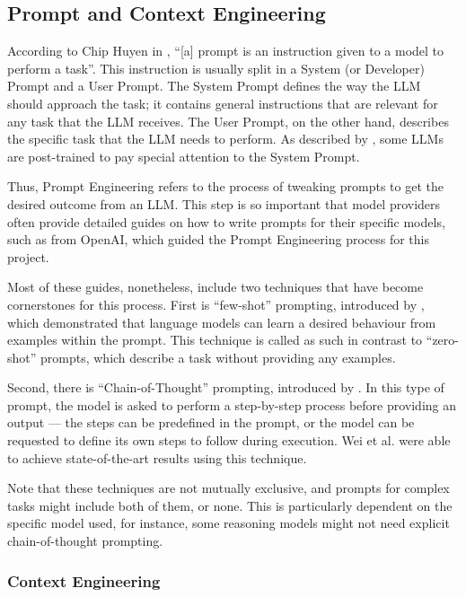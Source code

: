 \documentclass[a4paper]{report}
\begin{document}
\subsection{Prompt and Context Engineering}
\label{sec:prompt-enginering}

According to Chip Huyen in \cite{aiebook2025}, ``[a] prompt is an instruction given to a model to perform a task''. This instruction is usually split in a System (or Developer) Prompt and a User Prompt. The System Prompt defines the way the LLM should approach the task; it contains general instructions that are relevant for any task that the LLM receives. The User Prompt, on the other hand, describes the specific task that the LLM needs to perform. As described by \cite{wallace2024instructionhierarchytrainingllms}, some LLMs are post-trained to pay special attention to the System Prompt.

Thus, Prompt Engineering refers to the process of tweaking prompts to get the desired outcome from an LLM. This step is so important that model providers often provide detailed guides on how to write prompts for their specific models, such as \cite{openai2025promptengineering} from OpenAI, which guided the Prompt Engineering process for this project.

Most of these guides, nonetheless, include two techniques that have become cornerstones for this process. First is ``few-shot'' prompting, introduced by \cite{brown2020languagemodelsfewshotlearners}, which demonstrated that language models can learn a desired behaviour from examples within the prompt. This technique is called as such in contrast to ``zero-shot'' prompts, which describe a task without providing any examples.

Second, there is ``Chain-of-Thought'' prompting, introduced by \cite{wei2023chainofthoughtpromptingelicitsreasoning}. In this type of prompt, the model is asked to perform a step-by-step process before providing an output --- the steps can be predefined in the prompt, or the model can be requested to define its own steps to follow during execution. Wei et al. were able to achieve state-of-the-art results using this technique.

Note that these techniques are not mutually exclusive, and prompts for complex tasks might include both of them, or none. This is particularly dependent on the specific model used, for instance, some reasoning models might not need explicit chain-of-thought prompting.

\subsubsection{Context Engineering}
\end{document}
